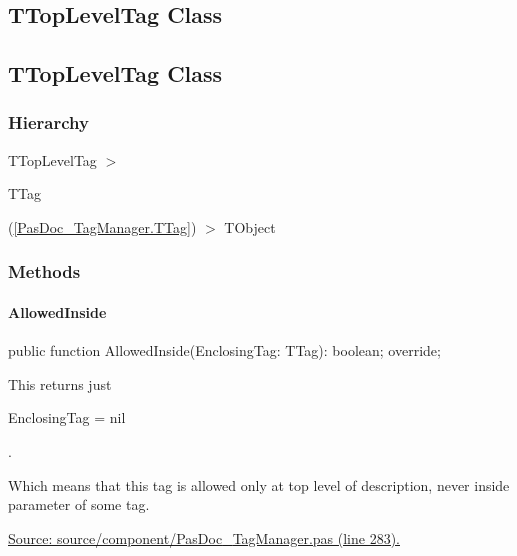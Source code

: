 \documentclass{report}
\newif\ifpdf
\begin{document}
\subsection*{\large{\textbf{TTopLevelTag Class}}\normalsize\hspace{1ex}\hrulefill}
\else
\subsection*{TTopLevelTag Class}
\fi
\label{PasDoc_TagManager.TTopLevelTag}
\subsubsection*{\large{\textbf{Hierarchy}}\normalsize\hspace{1ex}\hfill}
TTopLevelTag {$>$} \begin{ttfamily}TTag\end{ttfamily}(\ref{PasDoc_TagManager.TTag}) {$>$} 
TObject
\subsubsection*{\large{\textbf{Methods}}\normalsize\hspace{1ex}\hfill}
\paragraph*{AllowedInside}\hspace*{\fill}

\label{PasDoc_TagManager.TTopLevelTag-AllowedInside}
\begin{list}{}{
\setlength{\itemindent}{0cm}
\setlength{\listparindent}{0cm}
\setlength{\leftmargin}{\evensidemargin}
\addtolength{\leftmargin}{\tmplength}
\settowidth{\labelsep}{X}
\addtolength{\leftmargin}{\labelsep}
\setlength{\labelwidth}{\tmplength}
}
\item[\textbf{Declaration}\hfill]
\ifpdf
\begin{flushleft}
\fi
\begin{ttfamily}
public function AllowedInside(EnclosingTag: TTag): boolean; override;\end{ttfamily}

\ifpdf
\end{flushleft}
\fi

\par
\item[\textbf{Description}]
This returns just \begin{ttfamily}EnclosingTag = nil\end{ttfamily}.

Which means that this tag is allowed only at top level of description, never inside parameter of some tag.\par
\href{https://github.com/pasdoc/pasdoc/blob/master/source/component/PasDoc_TagManager.pas#L283}{Source: source/component/PasDoc{\_}TagManager.pas (line 283).}

\end{list}
\ifpdf
\end{document}
